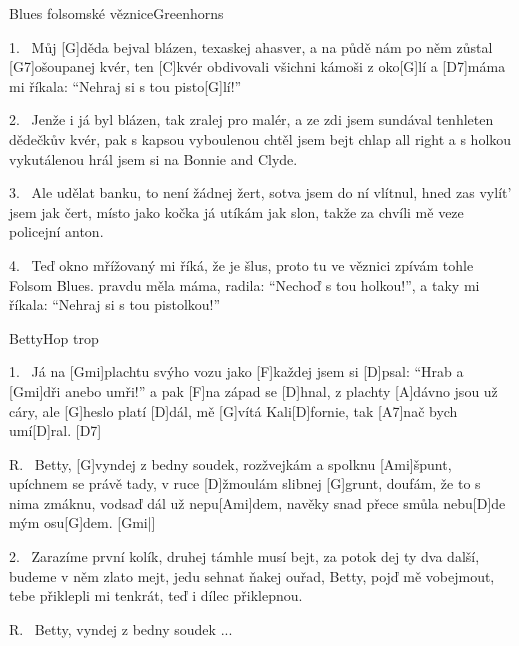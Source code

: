 \begin{song}{Blues folsomské věznice}{Greenhorns}

\begin{xverse}{1.~}
Můj [G]děda bejval blázen, texaskej ahasver,
a na půdě nám po něm zůstal [G7]ošoupanej kvér,
ten [C]kvér obdivovali všichni kámoši z oko[G]lí
a [D7]máma mi říkala: ``Nehraj si s tou pisto[G]lí!''
\end{xverse}

\begin{xverse}{2.~}
Jenže i já byl blázen, tak zralej pro malér,
a ze  zdi jsem sundával tenhleten dědečkův kvér,
pak s kapsou vyboulenou chtěl jsem bejt chlap all right
a s holkou vykutálenou hrál jsem si na Bonnie and Clyde.
\end{xverse}

\begin{xverse}{3.~}
Ale udělat banku, to není žádnej žert,
sotva jsem do ní vlítnul, hned zas vylít' jsem jak čert,
místo jako kočka já utíkám jak slon,
takže za chvíli mě veze policejní anton.
\end{xverse}

\begin{xverse}{4.~}
Teď okno mřížovaný mi říká, že je šlus,
proto tu ve věznici zpívám tohle Folsom Blues.
pravdu měla máma, radila: ``Nechoď s tou holkou!'',
a taky mi říkala: ``Nehraj si s tou pistolkou!''
\end{xverse}

\end{song}

\begin{song}{Betty}{Hop trop}

\begin{xverse}{1.~}
Já na [Gmi]plachtu svýho vozu jako [F]každej jsem si [D]psal:
``Hrab a [Gmi]dři anebo umři!'' a pak [F]na západ se [D]hnal,
z plachty [A]dávno jsou už cáry, ale [G]heslo platí [D]dál,
mě [G]vítá Kali[D]fornie, tak [A7]nač bych umí[D]ral. [D7]{}
\end{xverse}

\begin{xverse}{R.~}
Betty, [G]vyndej z bedny soudek, rozžvejkám a spolknu [Ami]{}špunt,
upíchnem se právě tady, v ruce [D]{}žmoulám slibnej [G]grunt,
doufám, že to s nima zmáknu, vodsaď dál už nepu[Ami]dem,
navěky snad přece smůla nebu[D]de mým osu[G]dem. [Gmi|]{}
\end{xverse}

\begin{xverse}{2.~}
Zarazíme první kolík, druhej támhle musí bejt,
za potok dej ty dva další, budeme v něm zlato mejt,
jedu sehnat ňakej ouřad, Betty, pojď mě vobejmout,
tebe přiklepli mi tenkrát, teď i dílec přiklepnou.
\end{xverse}

\begin{xverse}{R.~}
Betty, vyndej z bedny soudek ...
\end{xverse}

\end{song}

